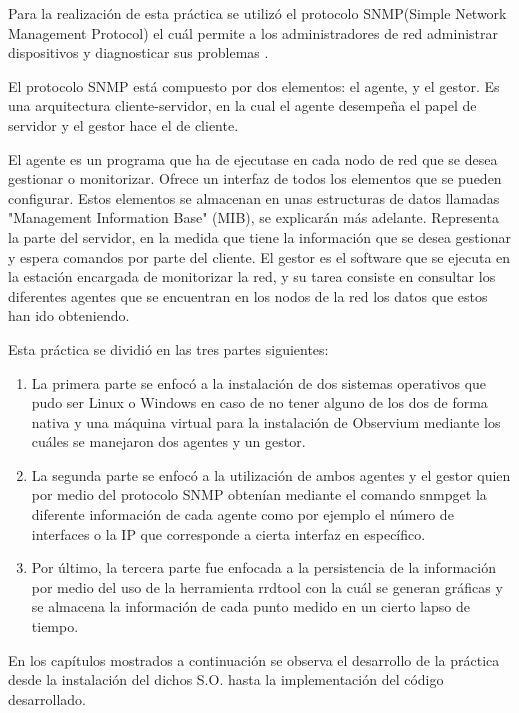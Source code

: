 Para la realización de esta práctica se utilizó el protocolo SNMP(Simple Network Management Protocol)  el cuál permite a los administradores de red administrar dispositivos  y diagnosticar sus problemas \cite{ccm}.
\\ \par
El protocolo SNMP está compuesto por dos elementos: el agente, y el gestor. Es una arquitectura cliente-servidor, en la cual el agente desempeña el papel de servidor y el gestor hace el de cliente.

El agente es un programa que ha de ejecutase en cada nodo de red que se desea gestionar o monitorizar. Ofrece un interfaz de todos los elementos que se pueden configurar. Estos elementos se almacenan en unas estructuras de datos llamadas "Management Information Base" (MIB), se explicarán más adelante. Representa la parte del servidor, en la medida que tiene la información que se desea gestionar y espera comandos por parte del cliente. El gestor es el software que se ejecuta en la estación encargada de monitorizar la red, y su tarea consiste en consultar los diferentes agentes que se encuentran en los nodos de la red los datos que estos han ido obteniendo\cite{snmp}. 
\\ \par
Esta práctica se dividió en las tres partes siguientes:
\begin{enumerate}
\item La primera parte se enfocó a la instalación de dos sistemas operativos que pudo ser Linux o Windows en caso de no tener alguno de los dos de forma nativa y una máquina virtual para la instalación de Observium mediante los cuáles se manejaron dos agentes y un gestor.
\item La segunda parte se enfocó a la utilización de ambos agentes y el gestor quien por medio del protocolo SNMP obtenían mediante el comando snmpget la diferente información de cada agente como por ejemplo el número de interfaces o la IP que corresponde a cierta interfaz en específico.
\item Por último, la tercera parte fue enfocada a la persistencia de la información por medio del uso de la herramienta rrdtool con la cuál se generan gráficas y se almacena la información de cada punto medido en un cierto lapso de tiempo.
\end{enumerate}

En los capítulos mostrados a continuación se observa el desarrollo de la práctica desde la instalación del dichos S.O. hasta la implementación del código desarrollado.



 